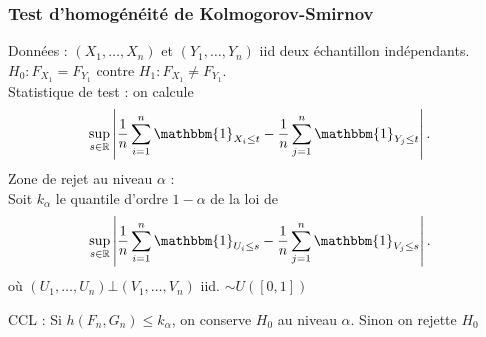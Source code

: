 \documentclass{article}
\theoremstyle{plain}%
\theoremstyle{definition}
\theoremstyle{remark}
\begin{document}
\subsubsection{Test d'homogénéité de Kolmogorov-Smirnov}
Données : $ (X_1, \dots, X_n) $ et $ (Y_1, \dots, Y_n) $ iid deux échantillon indépendants. $ H_0 : F_{X_1} = F_{Y_1} $ contre $ H_1 : F_{X_1} \neq F_{Y_1} $. \\ 
Statistique de test : on calcule 
\[
    \sup _{s \in \mathbb{R}} \left| \frac{1}{n}\sum_{i=1}^{n} \mathbbm{1}_{X_i \leq t} - \frac{1}{n}\sum_{j=1}^{n} \mathbbm{1}_{Y_j \leq t} \right| 
.\]
Zone de rejet au niveau $ \alpha  $ : \\
Soit $ k_\alpha  $ le quantile d'ordre $ 1 - \alpha  $ de la loi de 
\[
    \sup _{s \in \mathbb{R}} \left| \frac{1}{n}\sum_{i=1}^{n} \mathbbm{1}_{U_i \leq s} - \frac{1}{n}\sum_{j=1}^{n} \mathbbm{1}_{V_j \leq s} \right| 
.\]
où $ (U_1, \dots, U_n) \bot (V_1, \dots, V_n) $ iid. $ \sim U([0,1]) $

CCL : Si $ h(F_n, G_n) \leq k_\alpha  $, on conserve $ H_0 $ au niveau $ \alpha  $. Sinon on rejette $ H_0 $ 
\end{document}
